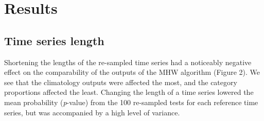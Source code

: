 \documentclass[]{article}
\begin{document}
\section{Results}\label{results}

\subsection{Time series length}\label{time-series-length}

Shortening the lengths of the re-sampled time series had a noticeably
negative effect on the comparability of the outputs of the MHW algorithm
(Figure 2). We see that the climatology outputs were affected the most,
and the category proportions affected the least. Changing the length of
a time series lowered the mean probability (\emph{p}-value) from the 100
re-sampled tests for each reference time series, but was accompanied by
a high level of variance.
\end{document}

